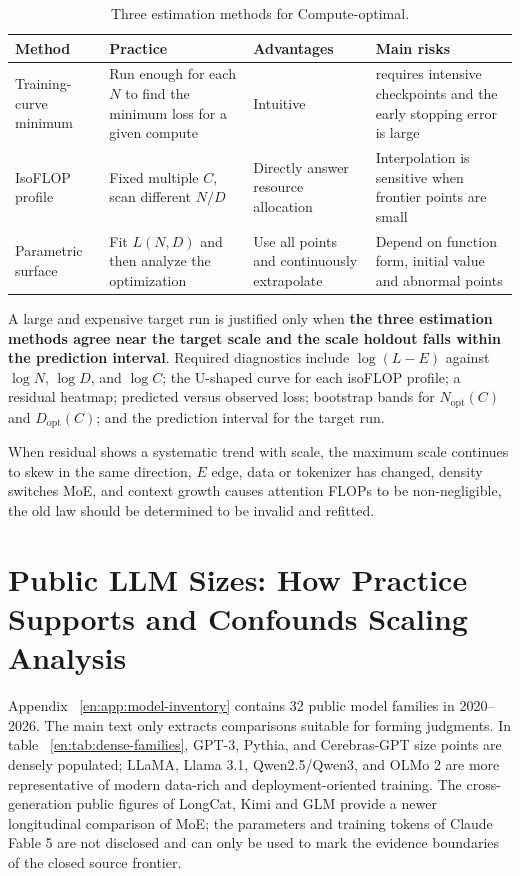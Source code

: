 \documentclass[UTF8,10pt,a4paper,fontset=none]{ctexart}
\begin{document}
\begin{table}[htbp]
\centering
\caption{Three estimation methods for Compute-optimal.}
\label{en:tab:fit-methods}
\begin{tabularx}{\textwidth}{Y Y Y Y}
\toprule
Method & Practice & Advantages & Main risks \\
\midrule
Training-curve minimum & Run enough for each $N$ to find the minimum loss for a given compute & Intuitive & requires intensive checkpoints and the early stopping error is large \\
IsoFLOP profile & Fixed multiple $C$, scan different $N/D$ & Directly answer resource allocation & Interpolation is sensitive when frontier points are small \\
Parametric surface & Fit $L(N,D)$ and then analyze the optimization & Use all points and continuously extrapolate & Depend on function form, initial value and abnormal points \\
\bottomrule
\end{tabularx}
\end{table}

A large and expensive target run is justified only when \textbf{the three estimation methods agree near the target scale and the scale holdout falls within the prediction interval}. Required diagnostics include $\log(L-E)$ against $\log N$, $\log D$, and $\log C$; the U-shaped curve for each isoFLOP profile; a residual heatmap; predicted versus observed loss; bootstrap bands for $N_{\mathrm{opt}}(C)$ and $D_{\mathrm{opt}}(C)$; and the prediction interval for the target run.

When residual shows a systematic trend with scale, the maximum scale continues to skew in the same direction, $E$ edge, data or tokenizer has changed, density switches MoE, and context growth causes attention FLOPs to be non-negligible, the old law should be determined to be invalid and refitted.

\section{Public LLM Sizes: How Practice Supports and Confounds Scaling Analysis}

Appendix ~\ref{en:app:model-inventory} contains 32 public model families in 2020--2026. The main text only extracts comparisons suitable for forming judgments. In table ~\ref{en:tab:dense-families}, GPT-3, Pythia, and Cerebras-GPT size points are densely populated; LLaMA, Llama 3.1, Qwen2.5/Qwen3, and OLMo 2 are more representative of modern data-rich and deployment-oriented training. The cross-generation public figures of LongCat, Kimi and GLM provide a newer longitudinal comparison of MoE; the parameters and training tokens of Claude Fable 5 are not disclosed and can only be used to mark the evidence boundaries of the closed source frontier.
\end{document}
